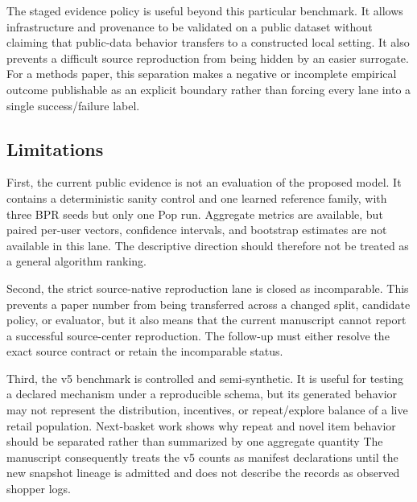 \documentclass[10pt,a4paper]{article}
\begin{document}
The staged evidence policy is useful beyond this particular benchmark. It
allows infrastructure and provenance to be validated on a public dataset
without claiming that public-data behavior transfers to a constructed local
setting. It also prevents a difficult source reproduction from being hidden by
an easier surrogate. For a methods paper, this separation makes a negative
or incomplete empirical outcome publishable as an explicit boundary rather
than forcing every lane into a single success/failure label.

\subsection{Limitations}

First, the current public evidence is not an evaluation of the proposed model.
It contains a deterministic sanity control and one learned reference family,
with three BPR seeds but only one Pop run. Aggregate metrics are available, but
paired per-user vectors, confidence intervals, and bootstrap estimates are not
available in this lane. The descriptive direction should therefore not be
treated as a general algorithm ranking.

Second, the strict source-native reproduction lane is closed as incomparable.
This prevents a paper number from being transferred across a changed split,
candidate policy, or evaluator, but it also means that the current manuscript
cannot report a successful source-center reproduction. The follow-up must either
resolve the exact source contract or retain the incomparable status.

Third, the v5 benchmark is controlled and semi-synthetic. It is useful for
testing a declared mechanism under a reproducible schema, but its generated
behavior may not represent the distribution, incentives, or repeat/explore
balance of a live retail population. Next-basket work shows why repeat and novel
item behavior should be separated rather than summarized by one aggregate
quantity \cite{li2023_nbr_reality} %
\cite{li2023_mask_swap} %
The manuscript consequently treats the v5 counts as manifest declarations until
the new snapshot lineage is admitted and does not describe the records as
observed shopper logs.
\end{document}
